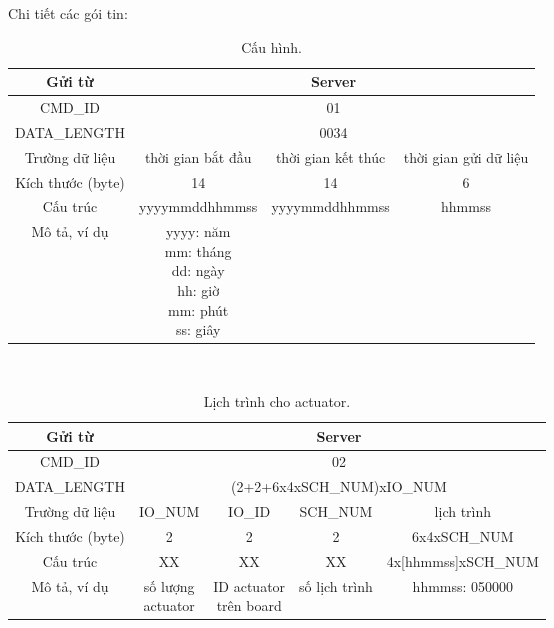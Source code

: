\documentclass[a4paper,12pt,oneside]{article}
\begin{document}
\noindent Chi tiết các gói tin:

\begin{table}[H]
\centering
\begin{tabular}{|c|c|c|c|}
\hline 
Gửi từ & \multicolumn{3}{c|}{Server} \\ 
\hline 
CMD\_ID & \multicolumn{3}{c|}{01} \\ 
\hline 
DATA\_LENGTH & \multicolumn{3}{c|}{0034} \\ 
\hline 
Trường dữ liệu & thời gian bắt đầu & thời gian kết thúc & thời gian gửi dữ liệu \\ 
\hline 
Kích thước (byte) & 14 & 14 & 6 \\ 
\hline 
Cấu trúc & yyyymmddhhmmss & yyyymmddhhmmss & hhmmss \\ 
\hline 
Mô tả, ví dụ & \makecell{yyyy: năm \\
mm: tháng \\ dd: ngày \\ hh: giờ \\ mm: phút \\ ss: giây} &  &  \\ 
\hline 
\end{tabular} 
\caption{Cấu hình.}
\end{table}
\noindent \\
\begin{table}[H]
\centering
\begin{tabular}{|c|c|c|c|c|}
\hline 
Gửi từ & \multicolumn{4}{c|}{Server} \\ 
\hline 
CMD\_ID & \multicolumn{4}{c|}{02} \\ 
\hline 
DATA\_LENGTH & \multicolumn{4}{c|}{(2+2+6x4xSCH\_NUM)xIO\_NUM}\\ 
\hline 
Trường dữ liệu & IO\_NUM & IO\_ID & SCH\_NUM & lịch trình \\ 
\hline 
Kích thước (byte) & 2 & 2 & 2 & 6x4xSCH\_NUM \\ 
\hline 
Cấu trúc & XX & XX & XX & 4x[hhmmss]xSCH\_NUM \\ 
\hline 
Mô tả, ví dụ & \makecell{số lượng \\actuator} & \makecell{ID actuator \\ trên board} & số lịch trình & hhmmss: 050000 \\ 
\hline 
\end{tabular} 
\caption{Lịch trình cho actuator.}
\end{table}
\noindent \\
\end{document}
